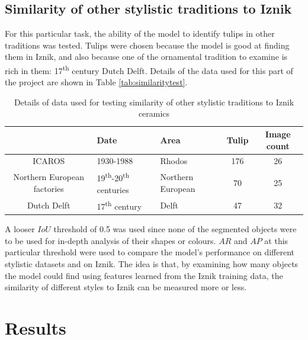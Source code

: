 \documentclass[11pt]{article}
\begin{document}
\subsection{Similarity of other stylistic traditions to Iznik}
For this particular task, the ability of the model to identify tulips in other traditions was tested. Tulips were chosen because the model is good at finding them in Iznik, and also because one of the ornamental tradition to examine is rich in them: 17\textsuperscript{th} century Dutch Delft. Details of the data used for this part of the project are shown in Table \ref{tab:similaritytest}.\par
\begin{table}[H]
\caption{Details of data used for testing similarity of other stylistic traditions to Iznik ceramics}
\small
\centering
\begin{tabular}{cp{3cm}p{3cm}cc} 
\hhline{~----}
 & Date & Area & Tulip & Image count \\ 
\hline
ICAROS & 1930-1988 & Rhodos & 176 & 26 \\ 
Northern European factories & 19\textsuperscript{th}-20\textsuperscript{th} centuries & Northern European  & 70 & 25\\ 
Dutch Delft & 17\textsuperscript{th} century & Delft & 47 & 32\\ 
\hline
\end{tabular}
\label{tab:similaritytestdata}
\end{table}
A looser $IoU$ threshold of 0.5 was used since none of the segmented objects were to be used for in-depth analysis of their shapes or colours. $AR$ and $AP$ at this particular threshold were used to compare the model's performance on different stylistic datasets and on Iznik. The idea is that, by examining how many objects the model could find using features learned from the Iznik training data, the similarity of different styles to Iznik can be measured more or less.\par 

\section{Results}
\end{document}
